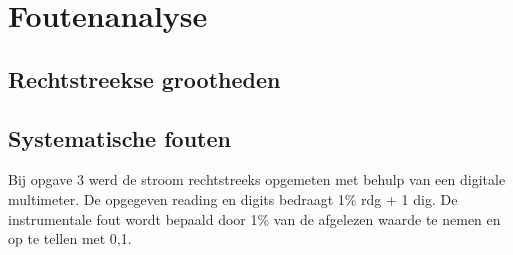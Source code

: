 \section{Foutenanalyse}
\subsection{Rechtstreekse grootheden}
\subsection{Systematische fouten}
Bij opgave 3 werd de stroom rechtstreeks opgemeten met behulp van een digitale multimeter.
De opgegeven reading en digits bedraagt 1\% rdg + 1 dig.
De instrumentale fout wordt bepaald door 1\% van de afgelezen waarde te nemen en op te tellen met 0,1.
